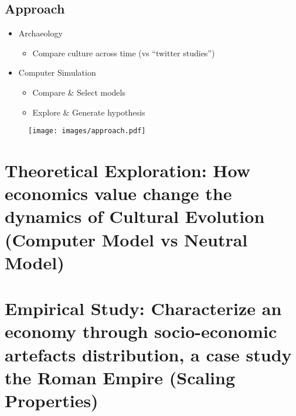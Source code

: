\documentclass[a4paper]{article}
\begin{document}
\subsection*{Approach}


\begin{itemize}
    \item Archaeology
	\begin{itemize}
	    \item Compare culture across time (vs ``twitter studies'')
	\end{itemize}
	\vfill
    \item Computer Simulation
	\begin{itemize}
	    \item Compare \& Select models
	    \item Explore \& Generate hypothesis
	\end{itemize}
\end{itemize}
%
\begin{figure}
    \texttt{[image: images/approach.pdf]}		
\end{figure}
%    
%
%    
%

\section{Theoretical Exploration: How economics value change the dynamics of Cultural Evolution (Computer Model vs Neutral Model) }
\section{ Empirical Study:  Characterize an economy through socio-economic artefacts distribution, a case study the Roman Empire (Scaling Properties)}
\end{document}

